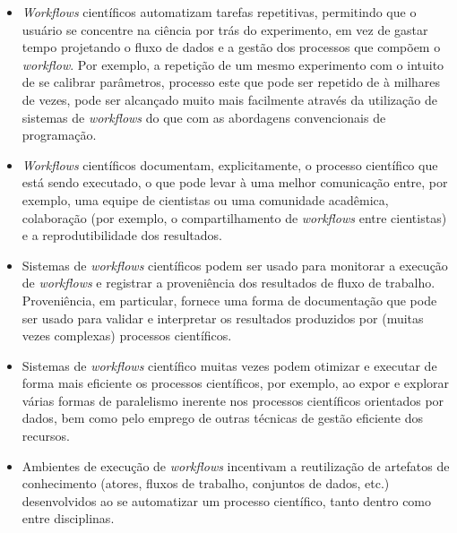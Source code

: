 \begin {itemize}
	\item \textit{Workflows} científicos automatizam tarefas repetitivas, permitindo que o usuário se concentre na ciência por trás do experimento, em vez de gastar tempo projetando o fluxo de dados e a gestão dos processos que compõem o \textit{workflow}. Por exemplo, a repetição de um mesmo experimento com o intuito de se calibrar parâmetros, processo este que pode ser repetido de à milhares de vezes, pode ser alcançado muito mais facilmente através da utilização de sistemas de \textit{workflows} do que com as abordagens convencionais de programação.	 
	\item \textit{Workflows} científicos documentam, explicitamente, o processo científico que está sendo executado, o que pode levar à uma melhor comunicação entre, por exemplo, uma equipe de cientistas ou uma comunidade acadêmica, colaboração (por exemplo, o compartilhamento de \textit{workflows} entre cientistas) e a reprodutibilidade dos resultados.
	\item Sistemas de \textit{workflows} científicos podem ser usado para monitorar a execução de \textit{workflows} e registrar a proveniência dos resultados de fluxo de trabalho. Proveniência, em particular, fornece uma forma de documentação que pode ser usado para validar e interpretar os resultados produzidos por (muitas vezes complexas) processos científicos.
	\item Sistemas de \textit{workflows} científico muitas vezes podem otimizar e executar de forma mais eficiente os processos científicos, por exemplo, ao expor e explorar várias formas de paralelismo inerente nos processos científicos orientados por dados, bem como pelo emprego de outras técnicas de gestão eficiente dos recursos.
	\item Ambientes de execução de \textit{workflows} incentivam a reutilização de artefatos de conhecimento (atores, fluxos de trabalho, conjuntos de dados, etc.) desenvolvidos ao se  automatizar um processo científico, tanto dentro como entre disciplinas.
\end {itemize}